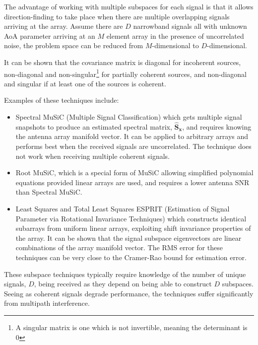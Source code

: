 The advantage of working with multiple subspaces for each signal is that it allows direction-finding to take place when there are multiple overlapping signals arriving at the array. Assume there are \(D\) narrowband signals all with unknown AoA parameter arriving at an \(M\) element array in the presence of uncorrelated noise, the problem space can be reduced from \(M\)-dimensional to \(D\)-dimensional\cite{van2004detection}.

It can be shown that the covariance matrix is diagonal for incoherent sources, non-diagonal and non-singular\footnote{A singular matrix is one which is not invertible, meaning the determinant is 0} for partially coherent sources, and non-diagonal and singular if at least one of the sources is coherent\cite{poisel2012electronic}. 

Examples of these techniques include\cite{van2004detection}:
\begin{itemize}
  \item Spectral MuSiC (Multiple Signal Classification) which gets multiple signal snapshots to produce an estimated spectral matrix, \(\hat{\mathbf{S}}_{\mathbf{x}}\), and requires knowing the antenna array manifold vector. It can be applied to arbitrary arrays and performs best when the received signals are uncorrelated. The technique does not work when receiving multiple coherent signals.
  \item Root MuSiC, which is a special form of MuSiC allowing simplified polynomial equations provided linear arrays are used, and requires a lower antenna SNR than Spectral MuSiC.
  \item Least Squares and Total Least Squares ESPRIT (Estimation of Signal Parameter via Rotational Invariance Techniques) which constructs identical subarrays from uniform linear arrays, exploiting shift invariance properties of the array. It can be shown that the signal subspace eigenvectors are linear combinations of the array manifold vector. The RMS error for these techniques can be very close to the Cramer-Rao bound for estimation error\cite{van2004detection}.
\end{itemize}
These subspace techniques typically require knowledge of the number of unique signals, \(D\), being received as they depend on being able to construct \(D\) subspaces. Seeing as coherent signals degrade performance, the techniques suffer significantly from multipath interference.
